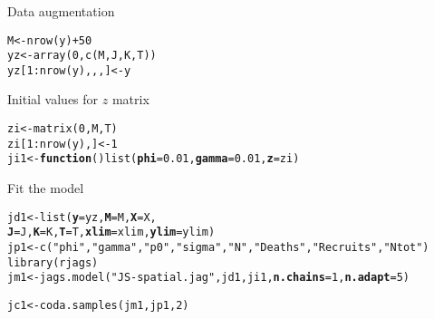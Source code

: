 \documentclass[color=usenames,dvipsnames]{beamer}\usepackage[]{graphicx}\usepackage[]{color}
\makeatletter
\newcommand{\hlnum}[1]{\textcolor[rgb]{0.69,0.494,0}{#1}}%
\newcommand{\hlstr}[1]{\textcolor[rgb]{0.749,0.012,0.012}{#1}}%
\newcommand{\hlopt}[1]{\textcolor[rgb]{0,0,0}{#1}}%
\newcommand{\hlstd}[1]{\textcolor[rgb]{0,0,0}{#1}}%
\newcommand{\hlkwa}[1]{\textcolor[rgb]{0,0,0}{\textbf{#1}}}%
\newcommand{\hlkwb}[1]{\textcolor[rgb]{0,0.341,0.682}{#1}}%
\newcommand{\hlkwc}[1]{\textcolor[rgb]{0,0,0}{\textbf{#1}}}%
\newcommand{\hlkwd}[1]{\textcolor[rgb]{0.004,0.004,0.506}{#1}}%
\newenvironment{kframe}{%
 \def\at@end@of@kframe{}%
 \ifinner\ifhmode%
  \def\at@end@of@kframe{\end{minipage}}%
  \begin{minipage}{\columnwidth}%
 \fi\fi%
 \def\FrameCommand##1{\hskip\@totalleftmargin \hskip-\fboxsep
 \colorbox{shadecolor}{##1}\hskip-\fboxsep
     \hskip-\linewidth \hskip-\@totalleftmargin \hskip\columnwidth}%
 \MakeFramed {\advance\hsize-\width
   \@totalleftmargin\z@ \linewidth\hsize
   \@setminipage}}%
 {\par\unskip\endMakeFramed%
 \at@end@of@kframe}
\newenvironment{knitrout}{}{} %
\makeatother
\begin{document}
\begin{frame}[fragile]
  \frametitle{\jags}
  {Data augmentation}
  \scriptsize
\begin{knitrout}
\color{fgcolor}\begin{kframe}
\begin{alltt}
\hlstd{M} \hlkwb{<-} \hlkwd{nrow}\hlstd{(y)} \hlopt{+} \hlnum{50}
\hlstd{yz} \hlkwb{<-} \hlkwd{array}\hlstd{(}\hlnum{0}\hlstd{,} \hlkwd{c}\hlstd{(M, J, K, T))}
\hlstd{yz[}\hlnum{1}\hlopt{:}\hlkwd{nrow}\hlstd{(y),,,]} \hlkwb{<-} \hlstd{y}
\end{alltt}
\end{kframe}
\end{knitrout}
\pause
\vfill
  {\normalsize Initial values for $z$ matrix}
\begin{knitrout}
\color{fgcolor}\begin{kframe}
\begin{alltt}
\hlstd{zi} \hlkwb{<-} \hlkwd{matrix}\hlstd{(}\hlnum{0}\hlstd{, M, T)}
\hlstd{zi[}\hlnum{1}\hlopt{:}\hlkwd{nrow}\hlstd{(y),]} \hlkwb{<-} \hlnum{1}
\hlstd{ji1} \hlkwb{<-} \hlkwa{function}\hlstd{()} \hlkwd{list}\hlstd{(}\hlkwc{phi}\hlstd{=}\hlnum{0.01}\hlstd{,} \hlkwc{gamma}\hlstd{=}\hlnum{0.01}\hlstd{,} \hlkwc{z}\hlstd{=zi)}
\end{alltt}
\end{kframe}
\end{knitrout}
\pause
\vfill
  {\normalsize Fit the model}
\begin{knitrout}
\color{fgcolor}\begin{kframe}
\begin{alltt}
\hlstd{jd1} \hlkwb{<-} \hlkwd{list}\hlstd{(}\hlkwc{y}\hlstd{=yz,} \hlkwc{M}\hlstd{=M,} \hlkwc{X}\hlstd{=X,}
            \hlkwc{J}\hlstd{=J,} \hlkwc{K}\hlstd{=K,} \hlkwc{T}\hlstd{=T,} \hlkwc{xlim}\hlstd{=xlim,} \hlkwc{ylim}\hlstd{=ylim)}
\hlstd{jp1} \hlkwb{<-} \hlkwd{c}\hlstd{(}\hlstr{"phi"}\hlstd{,} \hlstr{"gamma"}\hlstd{,} \hlstr{"p0"}\hlstd{,} \hlstr{"sigma"}\hlstd{,} \hlstr{"N"}\hlstd{,} \hlstr{"Deaths"}\hlstd{,} \hlstr{"Recruits"}\hlstd{,} \hlstr{"Ntot"}\hlstd{)}
\hlkwd{library}\hlstd{(rjags)}
\hlstd{jm1} \hlkwb{<-} \hlkwd{jags.model}\hlstd{(}\hlstr{"JS-spatial.jag"}\hlstd{, jd1, ji1,} \hlkwc{n.chains}\hlstd{=}\hlnum{1}\hlstd{,} \hlkwc{n.adapt}\hlstd{=}\hlnum{5}\hlstd{)}
\end{alltt}


{\ttfamily\noindent{}}\begin{alltt}
\hlstd{jc1} \hlkwb{<-} \hlkwd{coda.samples}\hlstd{(jm1, jp1,} \hlnum{2}\hlstd{)}
\end{alltt}
\end{kframe}
\end{knitrout}
\end{frame}
\end{document}
